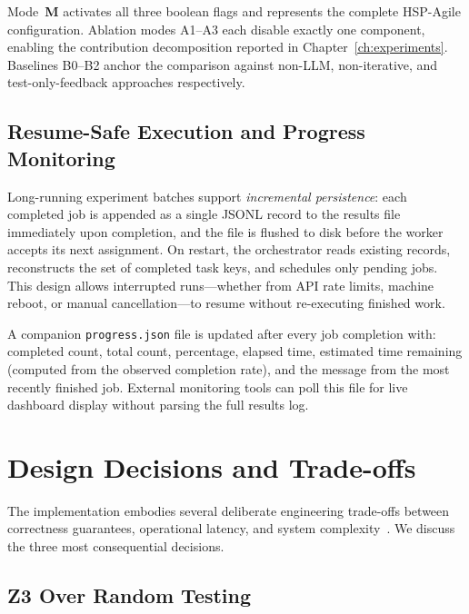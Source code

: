 Mode~\textbf{M} activates all three boolean flags and represents the
complete HSP-Agile configuration.  Ablation modes A1--A3 each disable
exactly one component, enabling the contribution decomposition reported in
Chapter~\ref{ch:experiments}.  Baselines B0--B2 anchor the comparison
against non-LLM, non-iterative, and test-only-feedback approaches
respectively.

\subsection{Resume-Safe Execution and Progress Monitoring}

Long-running experiment batches support \emph{incremental persistence}:
each completed job is appended as a single JSONL record to the results file
immediately upon completion, and the file is flushed to disk before the
worker accepts its next assignment.  On restart, the orchestrator reads
existing records, reconstructs the set of completed task keys, and schedules
only pending jobs.  This design allows interrupted runs---whether from API
rate limits, machine reboot, or manual cancellation---to resume without
re-executing finished work.

A companion \texttt{progress.json} file is updated after every job completion
with: completed count, total count, percentage, elapsed time, estimated time
remaining (computed from the observed completion rate), and the message from
the most recently finished job.  External monitoring tools can poll this
file for live dashboard display without parsing the full results log.

\section{Design Decisions and Trade-offs}
\label{sec:impl:tradeoffs}

The implementation embodies several deliberate engineering trade-offs between
correctness guarantees, operational latency, and system complexity~\citep{woodcock2009formalsurvey}.
We discuss the three most consequential decisions.

\subsection{Z3 Over Random Testing}

